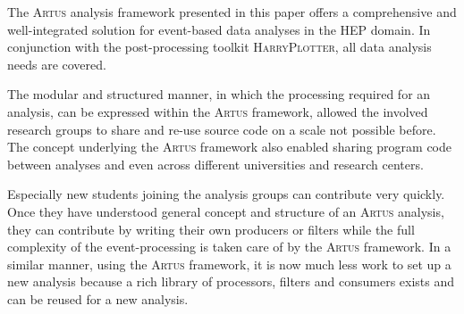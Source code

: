 \documentclass[3p]{elsarticle}
\newcommand{\software}[1]{\textsc{#1}\xspace}
\newcommand{\artus}{\software{Artus}}
\newcommand{\harryplotter}{\software{HarryPlotter}}
\begin{document}
The \artus analysis framework presented in this paper offers a comprehensive and well-integrated solution for event-based data analyses in the HEP domain.
In conjunction with the post-processing toolkit \harryplotter, all data analysis needs are covered.

The modular and structured manner, in which the processing required for an analysis, can be expressed within the \artus framework, allowed the involved research groups to share and re-use source code on a scale not possible before.
The concept underlying the \artus framework also enabled sharing program code between analyses and even across different universities and research centers.

Especially new students joining the analysis groups can contribute very quickly.
Once they have understood general concept and structure of an \artus analysis, they can contribute by writing their own producers or filters while the full complexity of the event-processing is taken care of by the \artus framework.
In a similar manner, using the \artus framework, it is now much less work to set up a new analysis because a rich library of processors, filters and consumers exists and can be reused for a new analysis.

\vspace{2cm}

\end{document}
